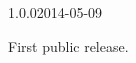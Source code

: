 \documentclass{ltxdockit}[2011/03/25]
\begin{document}
\printtitlepage
\tableofcontents

\begin{changelog}



\begin{release}{1.0.0}{2014-05-09}
\item First public release.
\end{release}
\end{changelog}
\end{document}

